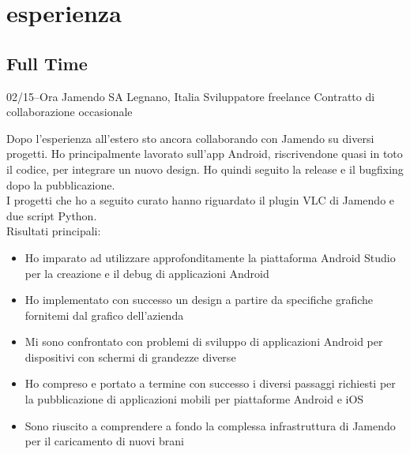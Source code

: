 \documentclass[print]{friggeri-custom} %
\begin{document}

\section{esperienza}

\subsection{Full Time}

\begin{entrylist}


\expentry
{02/15--Ora}
{Jamendo SA}
{Legnano, Italia}
{Sviluppatore freelance}
{Contratto di collaborazione occasionale}
{Dopo l'esperienza all'estero sto ancora collaborando con Jamendo su diversi progetti. Ho principalmente lavorato sull'app Android, riscrivendone quasi in toto il codice, per integrare un nuovo design. Ho quindi seguito la release e il bugfixing dopo la pubblicazione. \\
I progetti che ho a seguito curato hanno riguardato il plugin VLC di Jamendo e due script Python. \\
Risultati principali:
\begin{itemize}
  \item Ho imparato ad utilizzare approfonditamente la piattaforma Android Studio per la creazione e il debug di applicazioni Android
  \item Ho implementato con successo un design a partire da specifiche grafiche fornitemi dal grafico dell'azienda
  \item Mi sono confrontato con problemi di sviluppo di applicazioni Android per dispositivi con schermi di grandezze diverse
  \item Ho compreso e portato a termine con successo i diversi passaggi richiesti per la pubblicazione di applicazioni mobili per piattaforme Android e iOS
  \item Sono riuscito a comprendere a fondo la complessa infrastruttura di Jamendo per il caricamento di nuovi brani
\end{itemize}}


\end{entrylist}
\end{document}
